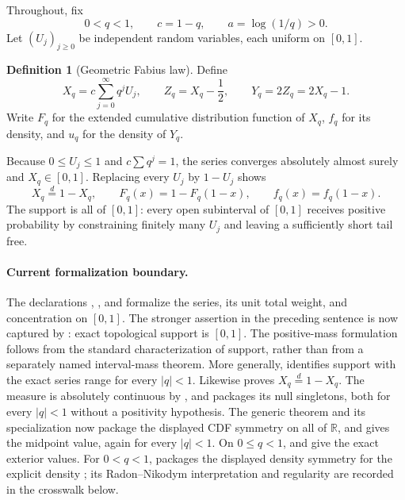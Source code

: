 \documentclass[11pt]{article}
\numberwithin{equation}{section}
\theoremstyle{definition}
\newtheorem{definition}[theorem]{Definition}
\theoremstyle{remark}
\newcommand{\R}{\mathbb R}
\begin{document}
Throughout, fix
\[
 0<q<1,
 \qquad c=1-q,
 \qquad a=\log(1/q)>0.
\]
Let $(U_j)_{j\ge0}$ be independent random variables, each uniform on $[0,1]$.

\begin{definition}[Geometric Fabius law]
\label{p10:def:qfabius}
Define
\begin{equation}
 X_q=c\sum_{j=0}^{\infty}q^jU_j,
 \qquad
 Z_q=X_q-\frac12,
 \qquad
 Y_q=2Z_q=2X_q-1.                         \label{p10:eq:q-law}
\end{equation}
Write $F_q$ for the extended cumulative distribution function of $X_q$,
$f_q$ for its density, and $u_q$ for the density of $Y_q$.
\end{definition}

Because $0\le U_j\le1$ and $c\sum q^j=1$, the series converges absolutely almost surely and
$X_q\in[0,1]$.  Replacing every $U_j$ by $1-U_j$ shows
\begin{equation}
 X_q\overset d=1-X_q,
 \qquad F_q(x)=1-F_q(1-x),
 \qquad f_q(x)=f_q(1-x).                   \label{p10:eq:symmetry}
\end{equation}
The support is all of $[0,1]$: every open subinterval of $[0,1]$ receives positive
probability by constraining finitely many $U_j$ and leaving a sufficiently short tail free.

\paragraph{Current formalization boundary.}
The declarations ,
, and
 formalize the series, its unit total weight, and
concentration on $[0,1]$.  The stronger assertion in the preceding sentence is now captured
by : exact topological support is
$[0,1]$.  The positive-mass formulation follows from the standard characterization of
support, rather than from a separately named interval-mass theorem.  More generally,
 identifies support with the exact
series range for every $|q|<1$.  Likewise
 proves
$X_q\overset d=1-X_q$.  The measure is absolutely continuous by
, and
 packages its null singletons, both
for every \(|q|<1\) without a positivity hypothesis.  The generic theorem
 and its specialization
 now package the displayed CDF symmetry on all of
\(\R\), and  gives the midpoint value, again for
every \(|q|<1\).  On \(0\le q<1\),
 and
 give the exact exterior values.  For \(0<q<1\),
 packages the displayed density symmetry for the
explicit density ; its Radon--Nikodym interpretation and
regularity are recorded in the crosswalk below.
\end{document}
